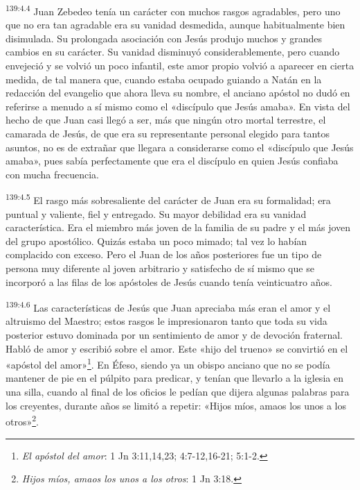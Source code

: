 \par 
\textsuperscript{139:4.4} Juan Zebedeo tenía un carácter con muchos rasgos agradables, pero uno que no era tan agradable era su vanidad desmedida, aunque habitualmente bien disimulada. Su prolongada asociación con Jesús produjo muchos y grandes cambios en su carácter. Su vanidad disminuyó considerablemente, pero cuando envejeció y se volvió un poco infantil, este amor propio volvió a aparecer en cierta medida, de tal manera que, cuando estaba ocupado guiando a Natán en la redacción del evangelio que ahora lleva su nombre, el anciano apóstol no dudó en referirse a menudo a sí mismo como el «discípulo que Jesús amaba». En vista del hecho de que Juan casi llegó a ser, más que ningún otro mortal terrestre, el camarada de Jesús, de que era su representante personal elegido para tantos asuntos, no es de extrañar que llegara a considerarse como el «discípulo que Jesús amaba», pues sabía perfectamente que era el discípulo en quien Jesús confiaba con mucha frecuencia.

\par 
\textsuperscript{139:4.5} El rasgo más sobresaliente del carácter de Juan era su formalidad; era puntual y valiente, fiel y entregado. Su mayor debilidad era su vanidad característica. Era el miembro más joven de la familia de su padre y el más joven del grupo apostólico. Quizás estaba un poco mimado; tal vez lo habían complacido con exceso. Pero el Juan de los años posteriores fue un tipo de persona muy diferente al joven arbitrario y satisfecho de sí mismo que se incorporó a las filas de los apóstoles de Jesús cuando tenía veinticuatro años.

\par 
\textsuperscript{139:4.6} Las características de Jesús que Juan apreciaba más eran el amor y el altruismo del Maestro; estos rasgos le impresionaron tanto que toda su vida posterior estuvo dominada por un sentimiento de amor y de devoción fraternal. Habló de amor y escribió sobre el amor. Este «hijo del trueno» se convirtió en el «apóstol del amor»\footnote{\textit{El apóstol del amor}: 1 Jn 3:11,14,23; 4:7-12,16-21; 5:1-2.}. En Éfeso, siendo ya un obispo anciano que no se podía mantener de pie en el púlpito para predicar, y tenían que llevarlo a la iglesia en una silla, cuando al final de los oficios le pedían que dijera algunas palabras para los creyentes, durante años se limitó a repetir: «Hijos míos, amaos los unos a los otros»\footnote{\textit{Hijos míos, amaos los unos a los otros}: 1 Jn 3:18.}.

